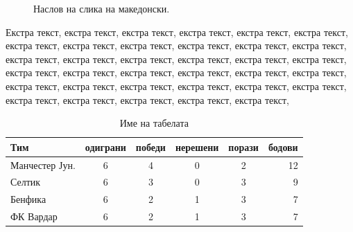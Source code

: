 \documentclass[a4paper]{report}
\begin{document}
  
 \begin{figure}[h!tb]
\centering
{}
\caption{Наслов на слика на македонски.}
\label{fig:animals}
\end{figure}

Екстра текст, екстра текст, екстра текст, екстра текст, екстра текст, екстра текст, екстра текст, екстра текст, екстра текст, екстра текст, екстра текст, екстра текст, екстра текст, екстра текст, екстра текст, екстра текст, екстра текст, екстра текст, екстра текст, екстра текст, екстра текст, екстра текст, екстра текст, екстра текст, екстра текст, екстра текст, екстра текст, екстра текст, екстра текст, екстра текст, екстра текст, екстра текст, екстра текст, екстра текст, екстра текст,

\begin{table}
\caption{Име на табелата}
\begin{tabular}{l*{4}{c}r}
Тим              & одиграни & победи & нерешени & порази & бодови \\
\hline
Манчестер Јун. & 6 & 4 & 0 & 2 & 12  \\
Селтик            & 6 & 3 & 0 & 3 &    9  \\
Бенфика           & 6 & 2 & 1 & 3 &    7  \\
ФК Вардар     & 6 & 2 & 1 & 3  &  7  \\
\end{tabular}
\end{table}
\end{document}
